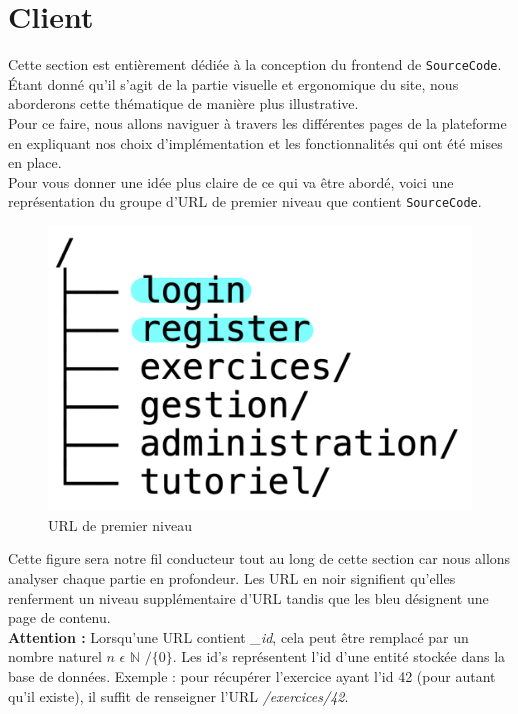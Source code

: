 \section{Client}

Cette section est entièrement dédiée à la conception du \gls{frontend} de \texttt{SourceCode}. Étant donné qu'il s'agit de la partie visuelle et ergonomique du site, nous aborderons cette thématique de manière plus illustrative.\\

Pour ce faire, nous allons naviguer à travers les différentes pages de la plateforme en expliquant nos choix d'implémentation et les fonctionnalités qui ont été mises en place.\\

Pour vous donner une idée plus claire de ce qui va être abordé, voici une représentation du groupe d'URL de premier niveau que contient \texttt{SourceCode}.\\

\begin{figure}[H]
    \includegraphics[width=\textwidth,height=0.15\textheight,keepaspectratio]{images/client/overview_client.jpeg}
    \centering
    \caption[SourceCode : Représentation des URL de premier niveau]{URL de premier niveau}
\end{figure}

Cette figure sera notre fil conducteur tout au long de cette section car nous allons analyser chaque partie en profondeur. 
Les URL en noir signifient qu'elles renferment un niveau supplémentaire d'URL tandis que les bleu désignent une page de contenu.\\

\textbf{Attention :} Lorsqu'une URL contient \textit{\_id}, cela peut être remplacé par un nombre naturel $ n $  $\epsilon$   $\mathbb{N}$ $/ \{0\}$. Les id's représentent l'id d'une entité stockée dans la base de données. Exemple : pour récupérer l'exercice ayant l'id 42 (pour autant qu'il existe), il suffit de renseigner l'URL \textit{/exercices/42}.\\


